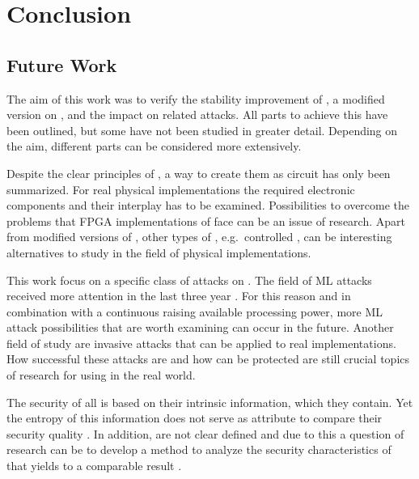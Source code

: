\chapter{Conclusion}
\label{cap:conclusion}

\section{Future Work}

The aim of this work was to verify the stability improvement of \mpufs, a modified version on \apufs, and the impact on related attacks.
All parts to achieve this have been outlined, but some have not been studied in greater detail.
Depending on the aim, different parts can be considered more extensively.

Despite the clear principles of \apufs, a way to create them as circuit has only been summarized.
For real physical implementations the required electronic components and their interplay has to be examined.
Possibilities to overcome the problems that \ac{FPGA} implementations of \apufs face can be an issue of research.
Apart from modified versions of \apufs, other types of \pufs, e.g.\ controlled \pufs, can be interesting alternatives to study in the field of physical implementations.

This work focus on a specific class of attacks on \pufs.
The field of \ac{ML} attacks received more attention in the last three year \cite{Google2017MachineTrends}.
For this reason and in combination with a continuous raising available processing power, more \ac{ML} attack possibilities that are worth examining can occur in the future.
Another field of study are invasive attacks that can be applied to real \puf implementations.
How successful these attacks are and how \pufs can be protected are still crucial topics of research for using \pufs in the real world.

The security of all \pufs is based on their intrinsic information, which they contain.
Yet the entropy of this information does not serve as attribute to compare their security quality \cite{Ruhrmair2010ModelingFunctions}.
In addition, \pufs are not clear defined and due to this a question of research can be to develop a method to analyze the security characteristics of \pufs that yields to a comparable result \cite{Becker2015ThePUFs}.

